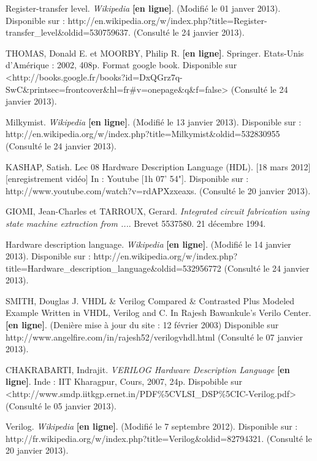 \documentclass{report}
\begin{document}
\begin{thebibliography}{1}

Register-transfer level. \textit{Wikipedia} \textbf{[en ligne]}. (Modifié le 01 janver 2013). Disponible sur : http://en.wikipedia.org/w/index.php?title=Register-transfer\_level\&oldid=530759637. (Consulté le 24 janvier 2013).

THOMAS, Donald E. et MOORBY, Philip R.  \textbf{[en ligne]}. Springer. Etats-Unis d'Amérique : 2002, 408p. Format google book. Disponible sur <http://books.google.fr/books?id=DxQGrz7q-SwC\&printsec=frontcover\&hl=fr#v=onepage\&q\&f=false> (Consulté le 24 janvier 2013).

Milkymist. \textit{Wikipedia} \textbf{[en ligne]}. (Modifié le 13 janvier 2013). Disponible sur : http://en.wikipedia.org/w/index.php?title=Milkymist\&oldid=532830955 (Consulté le 24 janvier 2013).

KASHAP, Satish. Lec 08 Hardware Description Language (HDL). [18 mars 2012] [enregistrement vidéo] In : Youtube [1h 07' 54"]. Disponible sur : http://www.youtube.com/watch?v=rdAPXzxeaxs. (Consulté le 20 janvier 2013).

GIOMI, Jean-Charles et TARROUX, Gerard. \textit{Integrated circuit fabrication using state machine extraction from ...}. Brevet 5537580. 21 décembre 1994.

Hardware description language. \textit{Wikipedia} \textbf{[en ligne]}. (Modifié le 14 janvier 2013). Disponible sur : http://en.wikipedia.org/w/index.php?title=Hardware\_description\_language\&oldid=532956772 (Consulté le 24 janvier 2013).

SMITH, Douglas J. VHDL \& Verilog Compared \& Contrasted Plus Modeled Example Written in VHDL, Verilog and C. In Rajesh Bawankule's Verilo Center. \textbf{[en ligne]}. (Denière mise à jour du site : 12 février 2003) Disponible sur http://www.angelfire.com/in/rajesh52/verilogvhdl.html (Consulté le 07 janvier 2013).

CHAKRABARTI, Indrajit. \textit{VERILOG Hardware Description Language} \textbf{[en ligne]}. Inde : IIT Kharagpur, Cours, 2007, 24p. Dispobible sur <http://www.smdp.iitkgp.ernet.in/PDF\%5CVLSI_DSP\%5CIC-Verilog.pdf> (Consulté le 05 janvier 2013).

Verilog. \textit{Wikipedia} \textbf{[en ligne]}. (Modifié le 7 septembre 2012). Disponible sur : http://fr.wikipedia.org/w/index.php?title=Verilog\&oldid=82794321. (Consulté le 20 janvier 2013).


\end{thebibliography}
\end{document}
